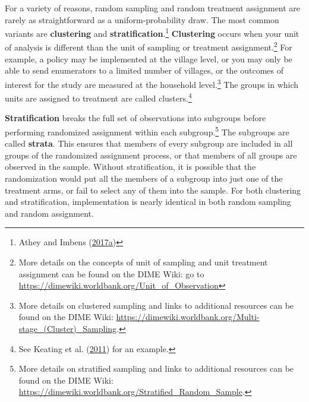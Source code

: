 \documentclass[
]{book}
\begin{document}
For a variety of reasons, random sampling and random treatment assignment
are rarely as straightforward as a uniform-probability draw.
The most common variants are \textbf{clustering} and \textbf{stratification}.\footnote{Athey and Imbens (\protect\hyperlink{ref-athey2017econometrics}{2017}\protect\hyperlink{ref-athey2017econometrics}{a})}
\textbf{Clustering} occurs when your unit of analysis is different
than the unit of sampling or treatment assignment.\footnote{More details on the concepts of unit of sampling
  and unit treatment assignment
  can be found on the DIME Wiki:
  go to \url{https://dimewiki.worldbank.org/Unit_of_Observation}}
For example, a policy may be implemented at the village level,
or you may only be able to send enumerators to a limited number of villages,
or the outcomes of interest for the study are measured at the household level.\footnote{More details on clustered sampling and
  links to additional resources can be found on the DIME Wiki:
  \url{https://dimewiki.worldbank.org/Multi-stage_(Cluster)_Sampling}.}
The groups in which units are assigned to treatment are called clusters.\footnote{See Keating et al. (\protect\hyperlink{ref-keating2011evaluating}{2011}) for an example.}

\textbf{Stratification} breaks the full set of observations into subgroups
before performing randomized assignment within each subgroup.\footnote{More details on stratified sampling and
  links to additional resources can be found on the DIME Wiki:
  \url{https://dimewiki.worldbank.org/Stratified_Random_Sample}.}
The subgroups are called \textbf{strata}.
This ensures that members of every subgroup
are included in all groups of the randomized assignment process,
or that members of all groups are observed in the sample.
Without stratification, it is possible that the randomization
would put all the members of a subgroup into just one of the treatment arms,
or fail to select any of them into the sample.
For both clustering and stratification,
implementation is nearly identical in both random sampling and random assignment.
\end{document}
